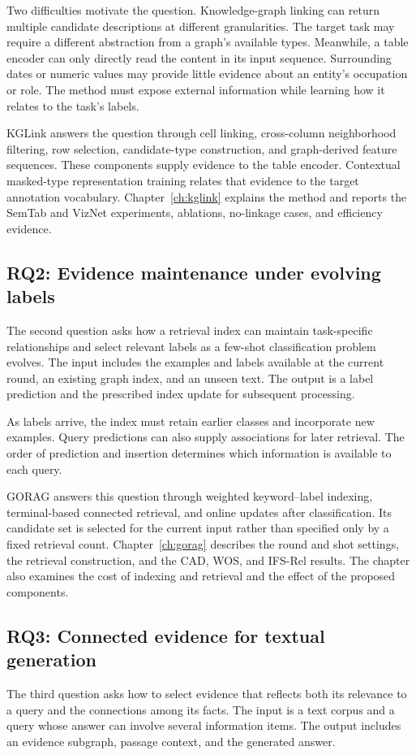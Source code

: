 Two difficulties motivate the question. Knowledge-graph linking can return multiple candidate descriptions at different granularities. The target task may require a different abstraction from a graph's available types. Meanwhile, a table encoder can only directly read the content in its input sequence. Surrounding dates or numeric values may provide little evidence about an entity's occupation or role. The method must expose external information while learning how it relates to the task's labels.

KGLink answers the question through cell linking, cross-column neighborhood filtering, row selection, candidate-type construction, and graph-derived feature sequences. These components supply evidence to the table encoder. Contextual masked-type representation training relates that evidence to the target annotation vocabulary. Chapter~\ref{ch:kglink} explains the method and reports the SemTab and VizNet experiments, ablations, no-linkage cases, and efficiency evidence.

\subsection{RQ2: Evidence maintenance under evolving labels}
The second question asks how a retrieval index can maintain task-specific relationships and select relevant labels as a few-shot classification problem evolves. The input includes the examples and labels available at the current round, an existing graph index, and an unseen text. The output is a label prediction and the prescribed index update for subsequent processing.

As labels arrive, the index must retain earlier classes and incorporate new examples. Query predictions can also supply associations for later retrieval. The order of prediction and insertion determines which information is available to each query.

GORAG answers this question through weighted keyword--label indexing, terminal-based connected retrieval, and online updates after classification. Its candidate set is selected for the current input rather than specified only by a fixed retrieval count. Chapter~\ref{ch:gorag} describes the round and shot settings, the retrieval construction, and the CAD, WOS, and IFS-Rel results. The chapter also examines the cost of indexing and retrieval and the effect of the proposed components.

\subsection{RQ3: Connected evidence for textual generation}
The third question asks how to select evidence that reflects both its relevance to a query and the connections among its facts. The input is a text corpus and a query whose answer can involve several information items. The output includes an evidence subgraph, passage context, and the generated answer.

